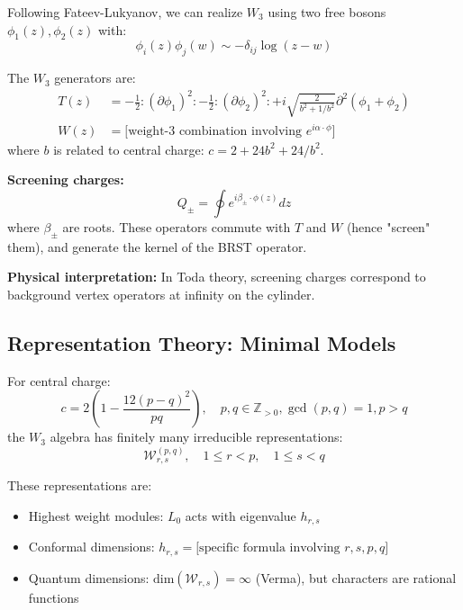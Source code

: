 \begin{construction}
\label{const:w3-screening}
Following Fateev-Lukyanov, we can realize $W_3$ using two free bosons $\phi_1(z), \phi_2(z)$ with:
$$\phi_i(z)\phi_j(w) \sim -\delta_{ij}\log(z-w)$$

The $W_3$ generators are:
\begin{align}
T(z) &= -\frac{1}{2}:(\partial\phi_1)^2: - \frac{1}{2}:(\partial\phi_2)^2: + i\sqrt{\frac{2}{b^2+1/b^2}}\partial^2(\phi_1 + \phi_2) \\
W(z) &= \text{[weight-3 combination involving } e^{i\alpha \cdot \phi}\text{]}
\end{align}
where $b$ is related to central charge: $c = 2 + 24b^2 + 24/b^2$.

\textbf{Screening charges:}
$$Q_{\pm} = \oint e^{i\beta_{\pm} \cdot \phi(z)} dz$$
where $\beta_{\pm}$ are roots. These operators commute with $T$ and $W$ (hence "screen" them), and generate the kernel of the BRST operator.

\textbf{Physical interpretation:} In Toda theory, screening charges correspond to background vertex operators at infinity on the cylinder.
\end{construction}

\subsection{Representation Theory: Minimal Models}

\begin{theorem}
\label{thm:w3-minimal}
For central charge:
$$c = 2\left(1 - \frac{12(p-q)^2}{pq}\right), \quad p,q \in \mathbb{Z}_{>0}, \gcd(p,q)=1, p>q$$
the $W_3$ algebra has finitely many irreducible representations:
$$\mathcal{W}_{r,s}^{(p,q)}, \quad 1 \le r < p, \quad 1 \le s < q$$

These representations are:
\begin{itemize}
\item Highest weight modules: $L_0$ acts with eigenvalue $h_{r,s}$
\item Conformal dimensions: $h_{r,s} = \text{[specific formula involving } r,s,p,q]$
\item Quantum dimensions: $\text{dim}(\mathcal{W}_{r,s}) = \infty$ (Verma), but characters are rational functions
\end{itemize}
\end{theorem}

